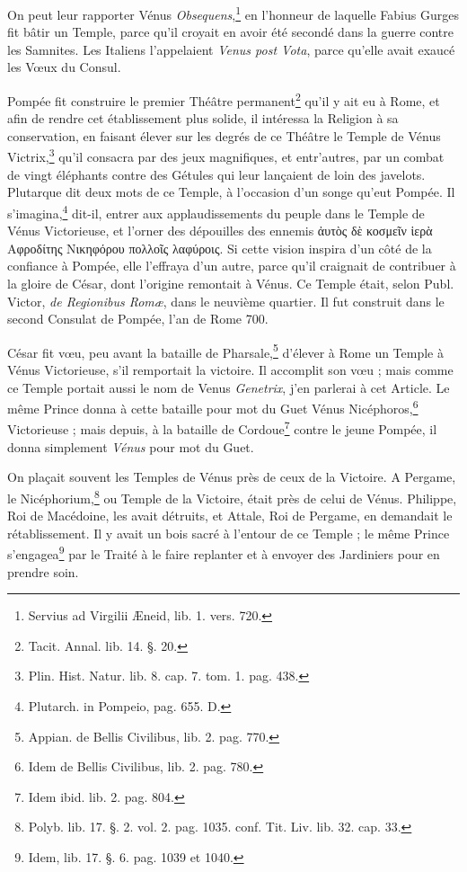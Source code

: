 \documentclass[a4paper, 18pt, oneside]{article}
\begin{document}
On peut leur rapporter Vénus \emph{Obsequens},\footnote{Servius ad Virgilii Æneid, lib. 1. vers. 720.} en l'honneur de laquelle Fabius Gurges fit bâtir un Temple, parce qu'il croyait en avoir été secondé dans la guerre contre les Samnites. Les Italiens l'appelaient \emph{Venus post Vota}, parce qu'elle avait exaucé les Vœux du Consul.

Pompée fit construire le premier Théâtre permanent\footnote{Tacit. Annal. lib. 14. §. 20.} qu'il y ait eu à Rome, et afin de rendre cet établissement plus solide, il intéressa la Religion à sa conservation, en faisant élever sur les degrés de ce Théâtre le Temple de Vénus Victrix,\footnote{Plin. Hist. Natur. lib. 8. cap. 7. tom. 1. pag. 438.} qu'il consacra par des jeux magnifiques, et entr'autres, par un combat de vingt éléphants contre des Gétules qui leur lançaient de loin des javelots. Plutarque dit deux mots de ce Temple, à l'occasion d'un songe qu'eut Pompée. Il s'imagina,\footnote{Plutarch. in Pompeio, pag. 655. D.} dit-il, entrer aux applaudissements du peuple dans le Temple de Vénus Victorieuse, et l'orner des dépouilles des ennemis ἀυτὸς δὲ κοσμεῖν ἱερὰ Αφροδίτης Νικηφόρου πολλοῖς λαφύροις. Si cette vision inspira d'un côté de la confiance à Pompée, elle l'effraya d'un autre, parce qu'il craignait de contribuer à la gloire de César, dont l'origine remontait à Vénus. Ce Temple était, selon Publ. Victor, \emph{de Regionibus Romæ}, dans le neuvième quartier. Il fut construit dans le second Consulat de Pompée, l'an de Rome 700.

César fit vœu, peu avant la bataille de Pharsale,\footnote{Appian. de Bellis Civilibus, lib. 2. pag. 770.} d'élever à Rome un Temple à Vénus Victorieuse, s'il remportait la victoire. Il accomplit son vœu ; mais comme ce Temple portait aussi le nom de Venus \emph{Genetrix}, j'en parlerai à cet Article. Le même Prince donna à cette bataille pour mot du Guet Vénus Nicéphoros,\footnote{Idem de Bellis Civilibus, lib. 2. pag. 780.} Victorieuse ; mais depuis, à la bataille de Cordoue\footnote{Idem ibid. lib. 2. pag. 804.} contre le jeune Pompée, il donna simplement \emph{Vénus} pour mot du Guet.

On plaçait souvent les Temples de Vénus près de ceux de la Victoire. A Pergame, le Nicéphorium,\footnote{Polyb. lib. 17. §. 2. vol. 2. pag. 1035. conf. Tit. Liv. lib. 32. cap. 33.} ou Temple de la Victoire, était près de celui de Vénus. Philippe, Roi de Macédoine, les avait détruits, et Attale, Roi de Pergame, en demandait le rétablissement. Il y avait un bois sacré à l'entour de ce Temple ; le même Prince s'engagea\footnote{Idem, lib. 17. §. 6. pag. 1039 et 1040.} par le Traité à le faire replanter et à envoyer des Jardiniers pour en prendre soin.
\end{document}

